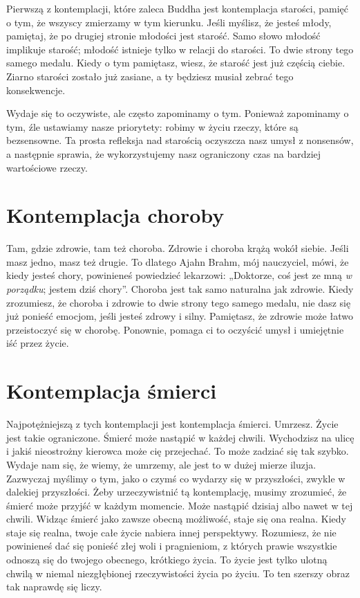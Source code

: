 \documentclass[12pt,openany]{book}
\begin{document}
Pierwszą z kontemplacji, które zaleca Buddha jest kontemplacja starości, pamięć o tym, że wszyscy zmierzamy w tym kierunku. Jeśli myślisz, że jesteś młody, pamiętaj, że po drugiej stronie młodości jest starość. Samo słowo młodość implikuje starość; młodość istnieje tylko w relacji do starości. To dwie strony tego samego medalu. Kiedy o tym pamiętasz, wiesz, że starość jest już częścią ciebie. Ziarno starości zostało już zasiane, a ty będziesz musiał zebrać tego konsekwencje.

Wydaje się to oczywiste, ale często zapominamy o tym. Ponieważ zapominamy o tym, źle ustawiamy nasze priorytety: robimy w życiu rzeczy, które są bezsensowne. Ta prosta refleksja nad starością oczyszcza nasz umysł z nonsensów, a następnie sprawia, że wykorzystujemy nasz ograniczony czas na bardziej war\-to\-ścio\-we rzeczy.

\section*{Kontemplacja choroby}

Tam, gdzie zdrowie, tam też choroba. Zdrowie i choroba krążą wokół siebie. Jeśli masz jedno, masz też drugie. To dlatego Ajahn Brahm, mój nauczyciel, mówi, że kiedy jesteś chory, powinieneś powiedzieć lekarzowi: „Doktorze, coś jest ze mną \textit{w porządku}; jestem dziś chory”. Choroba jest tak samo naturalna jak zdrowie. Kiedy zrozumiesz, że choroba i zdrowie to dwie strony tego samego medalu, nie dasz się już ponieść emocjom, jeśli jesteś zdro\-wy i silny. Pamiętasz, że zdrowie może łatwo przeistoczyć się w chorobę. Ponownie, pomaga ci to oczyścić umysł i umiejętnie iść przez życie.

\section*{Kontemplacja śmierci}

Najpotężniejszą z tych kontemplacji jest kontemplacja śmierci. \linebreak Umrzesz. Życie jest takie ograniczone. Śmierć może nastąpić w każdej chwili. Wychodzisz na ulicę i jakiś nieostrożny kierowca może cię przejechać. To może zadziać się tak szybko.
Wydaje nam się, że wiemy, że umrzemy, ale jest to w dużej mierze iluzja. Zazwyczaj myślimy o tym, jako o czymś co wydarzy się w przyszłości, zwykle w dalekiej przyszłości. Żeby urzeczywistnić tą kontemplację, musimy zrozumieć, że śmierć może przyjść w każdym momencie. Może nastąpić dzisiaj albo nawet w tej chwili. Widząc śmierć jako zawsze obecną możliwość, staje się ona realna. Kiedy staje się realna, twoje całe życie nabiera innej perspektywy. Rozumiesz, że nie powinieneś dać się ponieść złej woli i pragnieniom, z których prawie wszystkie odnoszą się do twojego obecnego, krótkiego życia. To życie jest tylko ulotną chwilą w niemal niezgłębionej rzeczywistości życia po życiu. To ten szerszy obraz tak naprawdę się liczy.
\end{document}

